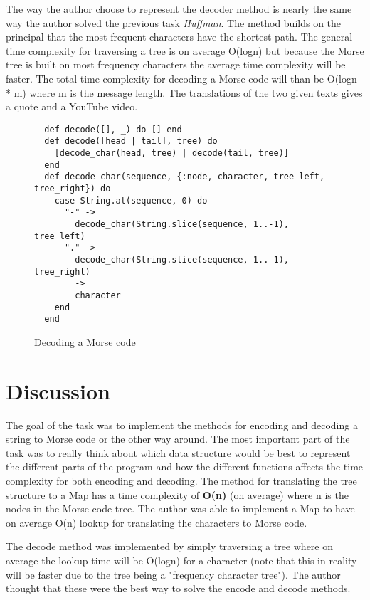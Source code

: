 \documentclass[a4paper,11pt]{article}
\begin{document}
The way the author choose to represent the decoder method is nearly the same way the author solved the previous task \textit{Huffman}. The method builds on the principal that the most frequent characters have the shortest path. The general time complexity for traversing a tree is on average O(logn) but because the Morse tree is built on most frequency characters the average time complexity will be faster. The total time complexity for decoding a Morse code will than be O(logn * m) where m is the message length. The translations of the two given texts gives a quote and a YouTube video.

\begin{figure}[H]
\begin{verbatim}
  def decode([], _) do [] end
  def decode([head | tail], tree) do
    [decode_char(head, tree) | decode(tail, tree)]
  end
  def decode_char(sequence, {:node, character, tree_left, tree_right}) do
    case String.at(sequence, 0) do
      "-" ->
        decode_char(String.slice(sequence, 1..-1), tree_left)
      "." ->
        decode_char(String.slice(sequence, 1..-1), tree_right)
      _ ->
        character
    end
  end
\end{verbatim}
\caption{Decoding a Morse code}
\label{Figure:3}
\end{figure}

\section*{Discussion}
The goal of the task was to implement the methods for encoding and decoding a string to Morse code or the other way around. The most important part of the task was to really think about which data structure would be best to represent the different parts of the program and how the different functions affects the time complexity for both encoding and decoding. The method for translating the tree structure to a Map has a time complexity of \textbf{O(n)} (on average) where n is the nodes in the Morse code tree. The author was able to implement a Map to have on average O(n) lookup for translating the characters to Morse code.

The decode method was implemented by simply traversing a tree where on average the lookup time will be O(logn) for a character (note that this in reality will be faster due to the tree being a "frequency character tree"). The author thought that these were the best way to solve the encode and decode methods.
\end{document}
